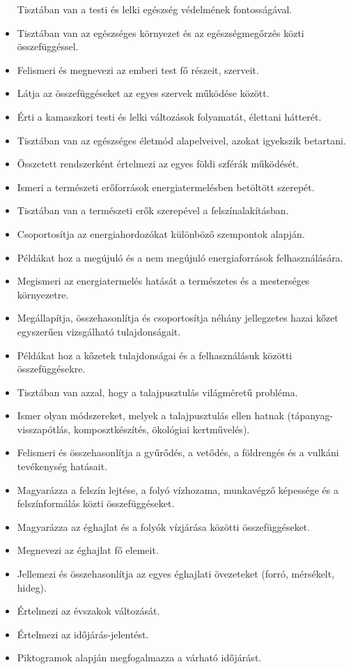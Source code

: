\begin{itemize}
  Tisztában van a testi és lelki egészség védelmének fontosságával.
\item
  Tisztában van az egészséges környezet és az egészségmegőrzés közti
  összefüggéssel.
\item
  Felismeri és megnevezi az emberi test fő részeit, szerveit.
\item
  Látja az összefüggéseket az egyes szervek működése között.
\item
  Érti a kamaszkori testi és lelki változások folyamatát, élettani
  hátterét.
\item
  Tisztában van az egészséges életmód alapelveivel, azokat igyekszik
  betartani.
\item
  Összetett rendszerként értelmezi az egyes földi szférák működését.
\item
  Ismeri a természeti erőforrások energiatermelésben betöltött szerepét.
\item
  Tisztában van a természeti erők szerepével a felszínalakításban.
\item
  Csoportosítja az energiahordozókat különböző szempontok alapján.
\item
  Példákat hoz a megújuló és a nem megújuló energiaforrások
  felhasználására.
\item
  Megismeri az energiatermelés hatását a természetes és a mesterséges
  környezetre.
\item
  Megállapítja, összehasonlítja és csoportosítja néhány jellegzetes
  hazai kőzet egyszerűen vizsgálható tulajdonságait.
\item
  Példákat hoz a kőzetek tulajdonságai és a felhasználásuk közötti
  összefüggésekre.
\item
  Tisztában van azzal, hogy a talajpusztulás világméretű probléma.
\item
  Ismer olyan módszereket, melyek a talajpusztulás ellen hatnak
  (tápanyag-visszapótlás, komposztkészítés, ökológiai kertművelés).
\item
  Felismeri és összehasonlítja a gyűrődés, a vetődés, a földrengés és a
  vulkáni tevékenység hatásait.
\item
  Magyarázza a felszín lejtése, a folyó vízhozama, munkavégző képessége
  és a felszínformálás közti összefüggéseket.
\item
  Magyarázza az éghajlat és a folyók vízjárása közötti összefüggéseket.
\item
  Megnevezi az éghajlat fő elemeit.
\item
  Jellemezi és összehasonlítja az egyes éghajlati övezeteket (forró,
  mérsékelt, hideg).
\item
  Értelmezi az évszakok változását.
\item
  Értelmezi az időjárás-jelentést.
\item
  Piktogramok alapján megfogalmazza a várható időjárást.
\end{itemize}


